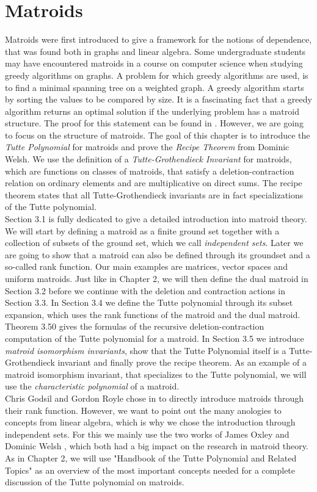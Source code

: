 \documentclass[12pt,a4paper, twoside, autooneside=false]{scrartcl}
\theoremstyle{definition}
\theoremstyle{remark}
\numberwithin{equation}{section}
\begin{document}
\section{Matroids}
Matroids were first introduced to give a framework for the notions of dependence, that was found both in graphs and linear algebra. Some undergraduate students may have encountered matroids in a course on computer science when studying greedy algorithms on graphs. A problem for which greedy algorithms are used, is to find a minimal spanning tree on a weighted graph. A greedy algorithm starts by sorting the values to be compared by size. It is a fascinating fact that a greedy algorithm returns an optimal solution if the underlying problem has a matroid structure. The proof for this statement can be found in \cite{Oxl2011}. However, we are going to focus on the structure of matroids. The goal of this chapter is to introduce the \textit{Tutte Polynomial} for matroids and prove the \textit{Recipe Theorem} from Dominic Welsh. We use the definition of a \textit{Tutte-Grothendieck Invariant} for matroids, which are functions on classes of matroids, that satisfy a deletion-contraction relation on ordinary elements and are multiplicative on direct sums. The recipe theorem states that all Tutte-Grothendieck invariants are in fact specializations of the Tutte polynomial. \\
\indent Section 3.1 is fully dedicated to give a detailed introduction into matroid theory. We will start by defining a matroid as a finite ground set together with a collection of subsets of the ground set, which we call \textit{independent sets}. Later we are going to show that a matroid can also be defined through its groundset and a so-called rank function. Our main examples are matrices, vector spaces and uniform matroids. Just like in Chapter 2, we will then define the dual matroid in Section 3.2 before we continue with the deletion and contraction actions in Section 3.3. In Section 3.4 we define the Tutte polynomial through its subset expansion, which uses the rank functions of the matroid and the dual matroid. Theorem 3.50 gives the formulas of the recursive deletion-contraction computation of the Tutte polynomial for a matroid. In Section 3.5 we introduce \textit{matroid isomorphism invariants}, show that the Tutte Polynomial itself is a Tutte-Grothendieck invariant and finally prove the recipe theorem. As an example of a matroid isomorphism invariant, that specializes to the Tutte polynomial, we will use the \textit{characteristic polynomial} of a matroid. \\ 
\indent Chris Godsil and Gordon Royle chose in \cite{GoRo2001} to directly introduce matroids through their rank function. However, we want to point out the many anologies to concepts from linear algebra, which is why we chose the introduction through independent sets. For this we mainly use the two works of James Oxley \cite{Oxl2011} and Dominic Welsh \cite{Wel1976}, which both had a big impact on the research in matroid theory. As in Chapter 2, we will use "Handbook of the Tutte Polynomial and Related Topics" \cite{ElMo2022} as an overview of the most important concepts needed for a complete discussion of the Tutte polynomial on matroids.
\end{document}
